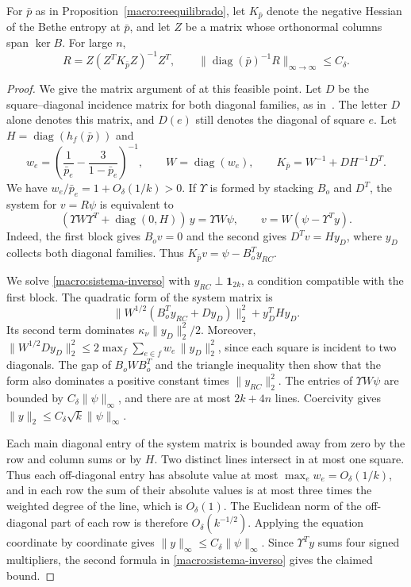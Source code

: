 \begin{lema}\label{macro:inversa}
For $\bar p$ as in Proposition~\ref{macro:reequilibrado}, let $K_{\bar p}$ denote the negative
Hessian of the Bethe entropy at $\bar p$, and let $Z$ be a matrix whose orthonormal columns span
$\ker B$. For large $n$,
\[
 R=Z(Z^TK_{\bar p}Z)^{-1}Z^T,\qquad
 \|\operatorname{diag}(\bar p)^{-1}R\|_{\infty\to\infty}\le C_\delta .
\]
\end{lema}
\begin{proof}
We give the matrix argument of \cite[Sections~6.3, 6.4 and~7.2]{pred} at this feasible point. Let $D$ be
the square--diagonal incidence matrix for both diagonal families, as in~\cite[Section~6.1]{pred}.
The letter $D$ alone denotes this matrix, and $D(e)$ still denotes the diagonal of square $e$. Let
$H=\operatorname{diag}(h_f(\bar p))$ and
\[
 w_e=\left(\frac1{\bar p_e}-\frac3{1-\bar p_e}\right)^{-1},
 \qquad W=\operatorname{diag}(w_e),\qquad
 K_{\bar p}=W^{-1}+DH^{-1}D^T .
\]
We have $w_e/\bar p_e=1+O_\delta(1/k)>0$. If $\Upsilon$ is formed by stacking $B_o$ and $D^T$, the
system for $v=R\psi$ is equivalent to
\begin{equation}\label{macro:sistema-inverso}
 (\Upsilon W\Upsilon^T+\operatorname{diag}(0,H))\,y=\Upsilon W\psi,\qquad
 v=W(\psi-\Upsilon^Ty).
\end{equation}
Indeed, the first block gives $B_ov=0$ and the second gives $D^Tv=Hy_D$, where $y_D$ collects both
diagonal families. Thus $K_{\bar p}v=\psi-B_o^Ty_{RC}$.

We solve \eqref{macro:sistema-inverso} with $y_{RC}\perp\mathbf1_{2k}$, a condition compatible with
the first block. The quadratic form of the system matrix is
\[
 \|W^{1/2}(B_o^Ty_{RC}+Dy_D)\|_2^2+y_D^THy_D .
\]
Its second term dominates $\kappa_\nu\|y_D\|_2^2/2$. Moreover,
$\|W^{1/2}Dy_D\|_2^2\le 2\max_f\sum_{e\in f}w_e\,\|y_D\|_2^2$,
since each square is incident to two diagonals. The gap of $B_oWB_o^T$ and the triangle inequality
then show that the form also dominates a positive constant times $\|y_{RC}\|_2^2$. The entries of
$\Upsilon W\psi$ are bounded by $C_\delta\|\psi\|_\infty$, and there are at most $2k+4n$ lines.
Coercivity gives $\|y\|_2\le C_\delta\sqrt{k}\|\psi\|_\infty$.

Each main diagonal entry of the system matrix is bounded away from zero by the row and column sums
or by $H$. Two distinct lines intersect in at most one square. Thus each off-diagonal entry has
absolute value at most $\max_e w_e=O_\delta(1/k)$, and in each row the sum of their absolute values
is at most three times the weighted degree of the line, which is $O_\delta(1)$. The Euclidean norm
of the off-diagonal part of each row is therefore $O_\delta(k^{-1/2})$. Applying the equation
coordinate by coordinate gives $\|y\|_\infty\le C_\delta\|\psi\|_\infty$. Since $\Upsilon^Ty$ sums
four signed multipliers, the second formula in \eqref{macro:sistema-inverso} gives the claimed bound.
\end{proof}

